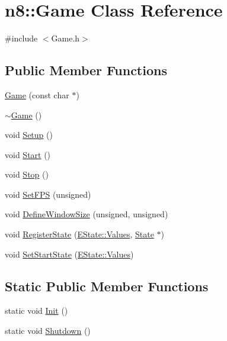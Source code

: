 \hypertarget{classn8_1_1_game}{\section{n8\-:\-:Game Class Reference}
\label{classn8_1_1_game}
}


{\ttfamily \#include $<$Game.\-h$>$}

\subsection*{Public Member Functions}
\begin{DoxyCompactItemize}
\item 
\hyperlink{classn8_1_1_game_a53a0ff7f30b16f7f6ba3c564d3bb2500}{Game} (const char $\ast$)
\item 
\hyperlink{classn8_1_1_game_a66c22b00c1ba720ad07f2a69da52932b}{$\sim$\-Game} ()
\item 
void \hyperlink{classn8_1_1_game_a364cbd476cf05de2b01310d4019afeb1}{Setup} ()
\item 
void \hyperlink{classn8_1_1_game_ab9f5035750e9d603187aaa3c33f6fd07}{Start} ()
\item 
void \hyperlink{classn8_1_1_game_acf99e1b0f6e504887dc9dc9a65bab3db}{Stop} ()
\item 
void \hyperlink{classn8_1_1_game_a30ff8d65fecc1f69edb401ad7d823bbb}{Set\-F\-P\-S} (unsigned)
\item 
void \hyperlink{classn8_1_1_game_ad63ea9f9325bedcb2d4d286e734d4e62}{Define\-Window\-Size} (unsigned, unsigned)
\item 
void \hyperlink{classn8_1_1_game_ab34fca1a3d62a460a2b470c59ef77372}{Register\-State} (\hyperlink{namespace_e_state_aee586325ec9fecd1205d41439870dd81}{E\-State\-::\-Values}, \hyperlink{classn8_1_1_state}{State} $\ast$)
\item 
void \hyperlink{classn8_1_1_game_a0c046c84911b1b02aeaed2e15da487a0}{Set\-Start\-State} (\hyperlink{namespace_e_state_aee586325ec9fecd1205d41439870dd81}{E\-State\-::\-Values})
\end{DoxyCompactItemize}
\subsection*{Static Public Member Functions}
\begin{DoxyCompactItemize}
\item 
static void \hyperlink{classn8_1_1_game_a07f1d9b3613d256ed65abc029f45263b}{Init} ()
\item 
static void \hyperlink{classn8_1_1_game_a2030218945ee955cb97e9c9c5dc31b0a}{Shutdown} ()
\end{DoxyCompactItemize}
